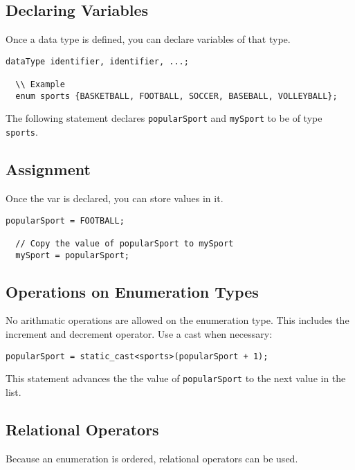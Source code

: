 \documentclass{article}
\begin{document}
\subsection{Declaring Variables}
Once a data type is defined, you can declare variables of that type.

\begin{lstlisting}[caption={\texttt{enum} Variable Declaration Syntax}]
  dataType identifier, identifier, ...; 

  \\ Example
  enum sports {BASKETBALL, FOOTBALL, SOCCER, BASEBALL, VOLLEYBALL};
\end{lstlisting}

The following statement declares \texttt{popularSport} and \texttt{mySport} to
be of type \texttt{sports}.

\subsection{Assignment}
Once the var is declared, you can store values in it.

\begin{lstlisting}[caption={\texttt{enum} Variable Assignment}]
  popularSport = FOOTBALL;

  // Copy the value of popularSport to mySport
  mySport = popularSport;
\end{lstlisting}

\subsection{Operations on Enumeration Types}
No arithmatic operations are allowed on the enumeration type. This includes the
increment and decrement operator. Use a cast when necessary:

\begin{lstlisting}[caption={\texttt{enum} Cast Example}]
  popularSport = static_cast<sports>(popularSport + 1);
\end{lstlisting}

This statement advances the the value of \texttt{popularSport} to the next
value in the list.

\subsection{Relational Operators}
Because an enumeration is ordered, relational operators can be used.
\end{document}
